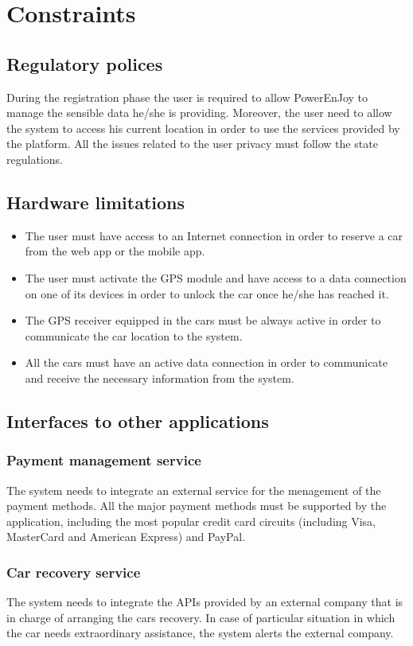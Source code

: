 \section{Constraints}
\subsection{Regulatory polices}
During the registration phase the user is required to allow PowerEnJoy to manage the sensible data he/she is providing. Moreover, the user need to allow the system to access his current location in order to use the services provided by the platform. All the issues related to the user privacy must follow the state regulations.

\subsection{Hardware limitations}
\begin{itemize}
	\item The user must have access to an Internet connection in order to reserve a car from the web app or the mobile app.
	\item The user must activate the GPS module and have access to a data connection on one of its devices in order to unlock the car once he/she has reached it.
	\item The GPS receiver equipped in the cars must be always active in order to communicate the car location to the system.
	\item All the cars must have an active data connection in order to communicate and receive the necessary information from the system.
\end{itemize}

\subsection{Interfaces to other applications}
\subsubsection{Payment management service}
The system needs to integrate an external service for the menagement of the payment methods. All the major payment methods must be supported by the application, including the most popular credit card circuits (including Visa, MasterCard and American Express) and PayPal.

\subsubsection{Car recovery service}
The system needs to integrate the APIs provided by an external company that is in charge of arranging the cars recovery. In case of particular situation in which the car needs extraordinary assistance, the system alerts the external company.